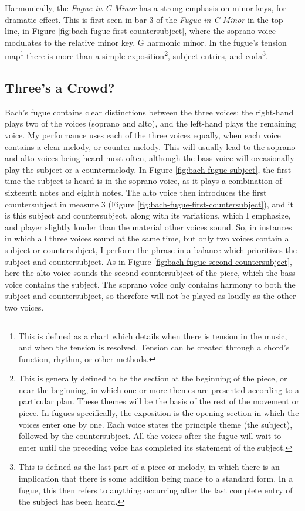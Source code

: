 Harmonically, the \textit{Fugue in C Minor} has a strong emphasis on minor keys, for dramatic effect. This is first seen in bar 3 of the \textit{Fugue in C Minor} in the top line, in Figure \ref{fig:bach-fugue-first-countersubject}\autocite{Henle_2009}, where the soprano voice modulates to the relative minor key, G harmonic minor. In the fugue's tension map\footnote{This is defined as a chart which details when there is tension in the music, and when the tension is resolved. Tension can be created through a chord's function, rhythm, or other methods.} there is more than a simple exposition\footnote{This is generally defined to be the section at the beginning of the piece, or near the beginning, in which one or more themes are presented according to a particular plan. These themes will be the basis of the rest of the movement or piece. In fugues specifically, the exposition is the opening section in which the voices enter one by one. Each voice states the principle theme (the subject), followed by the countersubject. All the voices after the fugue will wait to enter until the preceding voice has completed its statement of the subject.}\autocite{Walker_2001b}, subject entries, and coda\footnote{This is defined as the last part of a piece or melody, in which there is an implication that there is some addition being made to a standard form. In a fugue, this then refers to anything occurring after the last complete entry of the subject has been heard.}\autocite{Bullivant_2001}. 

\subsection{Three's a Crowd?}

Bach's fugue contains clear distinctions between the three voices; the right-hand plays two of the voices (soprano and alto), and the left-hand plays the remaining voice. My performance uses each of the three voices equally, when each voice contains a clear melody, or counter melody. This will usually lead to the soprano and alto voices being heard most often, although the bass voice will occasionally play the subject or a countermelody. In Figure \ref{fig:bach-fugue-subject}\autocite{Henle_2009}, the first time the subject is heard is in the soprano voice, as it plays a combination of sixteenth notes and eighth notes. The alto voice then introduces the first countersubject in measure 3 (Figure \ref{fig:bach-fugue-first-countersubject}\autocite{Henle_2009}), and it is this subject and countersubject, along with its variations, which I emphasize, and player slightly louder than the material other voices sound. So, in instances in which all three voices sound at the same time, but only two voices contain a subject or countersubject, I perform the phrase in a balance which prioritizes the subject and countersubject. As in Figure \ref{fig:bach-fugue-second-countersubject}\autocite{Henle_2009}, here the alto voice sounds the second countersubject of the piece, which the bass voice contains the subject. The soprano voice only contains harmony to both the subject and countersubject, so therefore will not be played as loudly as the other two voices. 

